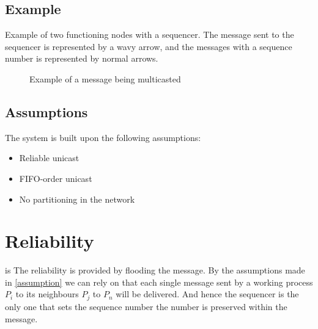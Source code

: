 \documentclass{article}
\begin{document}
 \subsection{Example}
 Example of two functioning nodes with a sequencer. The message sent to the sequencer is 
 represented by a wavy arrow, and the messages with a sequence number is represented by normal
 arrows.
  \begin{figure}[h]
    \centering
    \caption{Example of a message being multicasted}
    \label{fig1}
  \end{figure}
  
  \subsection{Assumptions}
  The system is built upon the following assumptions:
  \label{assumption}
  \begin{itemize}
  \item Reliable unicast
  \item FIFO-order unicast
  \item No partitioning in the network
  \end{itemize}  

\section{Reliability} is 
  \label{reliability}
  The reliability is provided by flooding the message. By the assumptions made in \ref{assumption} we can rely on 
  that each single message sent by a working process $P_i$ to its neighbours $P_j$ to $P_n$ will be delivered.
  And hence the sequencer is the only one that sets the sequence number the number is preserved within the message.
  
\end{document}
